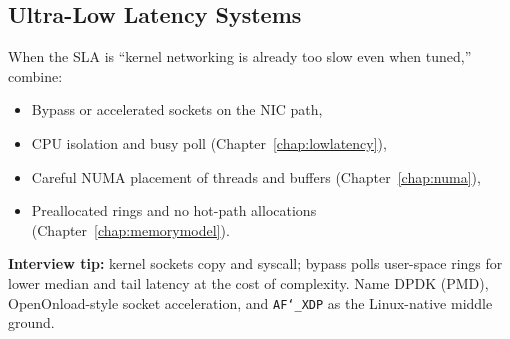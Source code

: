 \subsection{Ultra-Low Latency Systems}
\label{subsec:kernel-bypass-ultra-low-latency}
When the SLA is ``kernel networking is already too slow even when tuned,'' combine:
\begin{itemize}
    \item Bypass or accelerated sockets on the NIC path,
    \item CPU isolation and busy poll (Chapter~\ref{chap:lowlatency}),
    \item Careful NUMA placement of threads and buffers (Chapter~\ref{chap:numa}),
    \item Preallocated rings and no hot-path allocations (Chapter~\ref{chap:memorymodel}).
\end{itemize}
\par\noindent\textbf{Interview tip:} kernel sockets copy and syscall; bypass polls user-space rings for lower 
median and tail latency at the cost of complexity. Name DPDK (PMD), OpenOnload-style 
socket acceleration, and \texttt{AF\char`_XDP} as the Linux-native middle ground.
